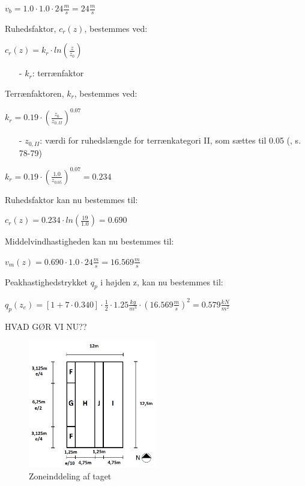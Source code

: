 \begin{center}
$v_b=1.0\cdot 1.0\cdot 24 \frac{m}{s}=24 \frac{m}{s}$
\end{center}
Ruhedsfaktor, $c_r(z)$, bestemmes ved:
\begin{center}
$c_r(z)=k_r\cdot ln(\frac{z}{z_0})$
\end{center}
\begin{itemize}
	\item[-] $k_r$: terrænfaktor
\end{itemize}
Terrænfaktoren, $k_r$, bestemmes ved:
\begin{center}
$k_r=0.19\cdot (\frac{z_0}{z_{0,II}})^{0.07}$
\end{center}
\begin{itemize}
	\item[-] $z_{0,II}$: værdi for ruhedslængde for terrænkategori II, som sættes til 0.05 (\citep{EU91}, s. 78-79)
\end{itemize}
\begin{center}
$k_r=0.19\cdot (\frac{1.0}{z_{0.05}})^{0.07}=0.234$
\end{center}
Ruhedsfaktor kan nu bestemmes til:
\begin{center}
$c_r(z)=0.234\cdot ln(\frac{19}{1.0})=0.690$
\end{center}
Middelvindhastigheden kan nu bestemmes til:
\begin{center}
$v_m(z)=0.690\cdot 1.0\cdot 24 \frac{m}{s}=16.569 \frac{m}{s}$
\end{center}
Peakhastighedstrykket $q_p$ i højden z, kan nu bestemmes til:
\begin{center}
$q_p(z_e)=[1+7\cdot 0.340]\cdot \frac{1}{2}\cdot 1.25 \frac{kg}{m^3}\cdot (16.569 \frac{m}{s})^2=0.579 \frac{kN}{m^2}$
\end{center}

HVAD GØR VI NU??

\begin{figure}[htbp]
	\centering
	\includegraphics[width=0.5\textwidth]{billeder/opdeling.png}
	\caption{Zoneinddeling af taget}
	\label{fig:tag}
\end{figure}

